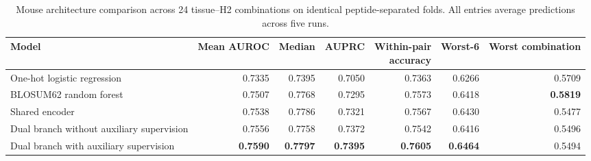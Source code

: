 \begin{table}[!b]
\centering
\caption{Mouse architecture comparison across 24 tissue--H2 combinations on identical peptide-separated folds. All entries average predictions across five runs.}
\label{tab:mouse-strict-architectures}
\fontsize{7.5}{8.5}\selectfont
\renewcommand{\arraystretch}{0.98}
\setlength{\tabcolsep}{1pt}
\begin{tabularx}{\textwidth}{>{\raggedright\arraybackslash}Xrrrrrr}
\toprule
Model & Mean AUROC & Median & AUPRC & \shortstack{Within-pair\\accuracy} & Worst-6 & Worst combination \\
\midrule
One-hot logistic regression & 0.7335 & 0.7395 & 0.7050 & 0.7363 & 0.6266 & 0.5709 \\
BLOSUM62 random forest & 0.7507 & 0.7768 & 0.7295 & 0.7573 & 0.6418 & \textbf{0.5819} \\
Shared encoder & 0.7538 & 0.7786 & 0.7321 & 0.7567 & 0.6430 & 0.5477 \\
Dual branch without auxiliary supervision & 0.7556 & 0.7758 & 0.7372 & 0.7542 & 0.6416 & 0.5496 \\
Dual branch with auxiliary supervision & \textbf{0.7590} & \textbf{0.7797} & \textbf{0.7395} & \textbf{0.7605} & \textbf{0.6464} & 0.5494 \\
\bottomrule
\end{tabularx}
\end{table}

